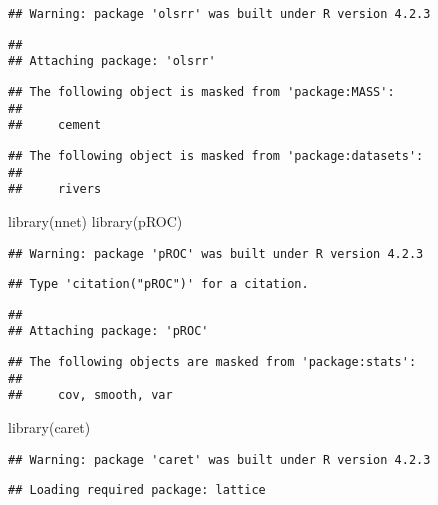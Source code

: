 \documentclass[
]{article}
\newenvironment{Shaded}{\begin{snugshade}}{\end{snugshade}}
\newcommand{\FunctionTok}[1]{\textcolor[rgb]{0.00,0.00,0.00}{#1}}
\newcommand{\NormalTok}[1]{#1}
\begin{document}
\begin{verbatim}
## Warning: package 'olsrr' was built under R version 4.2.3
\end{verbatim}

\begin{verbatim}
## 
## Attaching package: 'olsrr'
\end{verbatim}

\begin{verbatim}
## The following object is masked from 'package:MASS':
## 
##     cement
\end{verbatim}

\begin{verbatim}
## The following object is masked from 'package:datasets':
## 
##     rivers
\end{verbatim}

\begin{Shaded}
\begin{Highlighting}[]
\FunctionTok{library}\NormalTok{(nnet)}
\FunctionTok{library}\NormalTok{(pROC) }
\end{Highlighting}
\end{Shaded}

\begin{verbatim}
## Warning: package 'pROC' was built under R version 4.2.3
\end{verbatim}

\begin{verbatim}
## Type 'citation("pROC")' for a citation.
\end{verbatim}

\begin{verbatim}
## 
## Attaching package: 'pROC'
\end{verbatim}

\begin{verbatim}
## The following objects are masked from 'package:stats':
## 
##     cov, smooth, var
\end{verbatim}

\begin{Shaded}
\begin{Highlighting}[]
\FunctionTok{library}\NormalTok{(caret)}
\end{Highlighting}
\end{Shaded}

\begin{verbatim}
## Warning: package 'caret' was built under R version 4.2.3
\end{verbatim}

\begin{verbatim}
## Loading required package: lattice
\end{verbatim}
\end{document}

